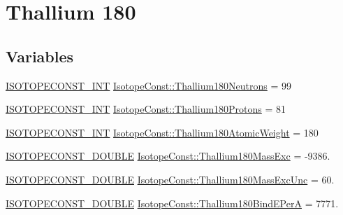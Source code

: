 \hypertarget{group___isotope_const-_thallium-_tl180}{}\section{Thallium 180}
\label{group___isotope_const-_thallium-_tl180}
\subsection*{Variables}
\begin{DoxyCompactItemize}
\item 
\mbox{\hyperlink{group___isotope_const-_macros_ga5f18360b3e99483a35c32d789e62621c}{I\+S\+O\+T\+O\+P\+E\+C\+O\+N\+S\+T\+\_\+\+I\+NT}} \mbox{\hyperlink{group___isotope_const-_thallium-_tl180_gad381c677e8e5c9aab03b11609a1dd8db}{Isotope\+Const\+::\+Thallium180\+Neutrons}} = 99
\item 
\mbox{\hyperlink{group___isotope_const-_macros_ga5f18360b3e99483a35c32d789e62621c}{I\+S\+O\+T\+O\+P\+E\+C\+O\+N\+S\+T\+\_\+\+I\+NT}} \mbox{\hyperlink{group___isotope_const-_thallium-_tl180_gad65cf82c94338b16b76f2825a8fd5342}{Isotope\+Const\+::\+Thallium180\+Protons}} = 81
\item 
\mbox{\hyperlink{group___isotope_const-_macros_ga5f18360b3e99483a35c32d789e62621c}{I\+S\+O\+T\+O\+P\+E\+C\+O\+N\+S\+T\+\_\+\+I\+NT}} \mbox{\hyperlink{group___isotope_const-_thallium-_tl180_ga7a18dd60e6eeccc14e8c332582ac343e}{Isotope\+Const\+::\+Thallium180\+Atomic\+Weight}} = 180
\item 
\mbox{\hyperlink{group___isotope_const-_macros_ga8f45a7272ce02c0b4c65c44636ed719a}{I\+S\+O\+T\+O\+P\+E\+C\+O\+N\+S\+T\+\_\+\+D\+O\+U\+B\+LE}} \mbox{\hyperlink{group___isotope_const-_thallium-_tl180_gab002a79f2a16fe8e07b6c33a0bea72b9}{Isotope\+Const\+::\+Thallium180\+Mass\+Exc}} = -\/9386.
\item 
\mbox{\hyperlink{group___isotope_const-_macros_ga8f45a7272ce02c0b4c65c44636ed719a}{I\+S\+O\+T\+O\+P\+E\+C\+O\+N\+S\+T\+\_\+\+D\+O\+U\+B\+LE}} \mbox{\hyperlink{group___isotope_const-_thallium-_tl180_ga1da294eb62a8ec08abeff896016a2cf9}{Isotope\+Const\+::\+Thallium180\+Mass\+Exc\+Unc}} = 60.
\item 
\mbox{\hyperlink{group___isotope_const-_macros_ga8f45a7272ce02c0b4c65c44636ed719a}{I\+S\+O\+T\+O\+P\+E\+C\+O\+N\+S\+T\+\_\+\+D\+O\+U\+B\+LE}} \mbox{\hyperlink{group___isotope_const-_thallium-_tl180_gab971597748f13cb9c1d98720f91cc7f9}{Isotope\+Const\+::\+Thallium180\+Bind\+E\+PerA}} = 7771.
\item 

\end{DoxyCompactItemize}
